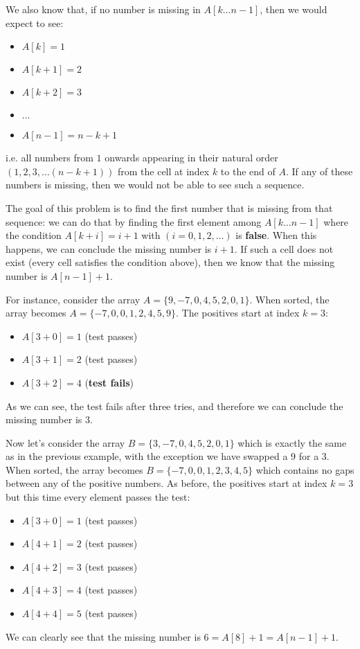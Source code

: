 We also know that, if no number is missing in $A[k \ldots n-1]$, then we would expect to see: 
\begin{itemize}
	\item $A[k]=1$
	\item $A[k+1]=2$
	\item $A[k+2]=3$
	\item $\ldots$
	\item $A[n-1]=n-k+1$
\end{itemize}

i.e. all numbers from $1$ onwards appearing in their natural order $(1,2,3, \ldots (n-k+1))$ from the cell at index $k$ to the end of $A$. 
If any of these numbers is missing, then we would not be able to see such a sequence.

The goal of this problem is to find the first number that is missing from that sequence: we can do that by finding the first element among $A[k \ldots n-1]$  where the condition $A[k+i]=i+1$ with $(i=0,1,2, \ldots)$ is \textbf{false}. When this happens, we can conclude the missing number is $i+1$.
If such a cell does not exist (every cell satisfies the condition above), then we know that the missing number is $A[n-1]+1$.

For instance, consider the array $A=\{ 9,-7,0,4,5,2,0,1\}$. When sorted, the array
becomes $A=\{ -7,0,0,1,2,4,5,9\}$. The positives start at index $k=3$:
\begin{itemize}
	\item $A[3+0] = 1$ (test passes)
	\item $A[3+1] = 2$ (test passes)
	\item $A[3+2] = 4$ (\textbf{test fails})
\end{itemize}
As we can see, the test fails after three tries, and therefore we can conclude the missing number is $3$.


Now let's consider the array $B=\{ 3,-7,0,4,5,2,0,1\}$ which is exactly the same as in the previous example, with the exception we have swapped a $9$ for a $3$. When sorted, the array
becomes $B=\{ -7,0,0,1,2,3,4,5\}$ which contains no gaps between any of the positive numbers. As before, the positives start at index $k=3$ but this time every element passes the test:
\begin{itemize}
	\item $A[3+0] = 1$ (test passes)
	\item $A[4+1] = 2$ (test passes)
	\item $A[4+2] = 3$ (test passes)
	\item $A[4+3] = 4$ (test passes)
	\item $A[4+4] = 5$ (test passes)
\end{itemize}
We can clearly see that the missing number is $6 = A[8]+1 = A[n-1]+1$.

